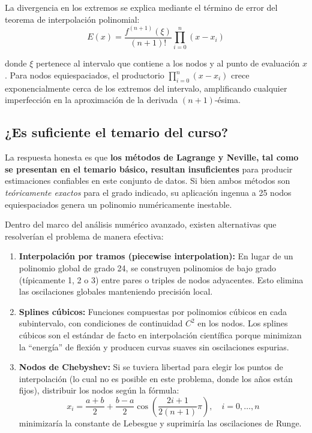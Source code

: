 \documentclass[12pt, letterpaper]{article}
\begin{document}
La divergencia en los extremos se explica mediante el término de error del teorema de interpolación polinomial:
\begin{equation}\label{eq:error}
E(x) = \frac{f^{(n+1)}(\xi)}{(n+1)!} \prod_{i=0}^{n} (x - x_i)
\end{equation}

donde $\xi$ pertenece al intervalo que contiene a los nodos y al punto de evaluación $x$. Para nodos equiespaciados, el productorio $\prod_{i=0}^{n} (x - x_i)$ crece exponencialmente cerca de los extremos del intervalo, amplificando cualquier imperfección en la aproximación de la derivada $(n+1)$-ésima.

\subsection{¿Es suficiente el temario del curso?}\label{subsec:temario}

La respuesta honesta es que \textbf{los métodos de Lagrange y Neville, tal como se presentan en el temario básico, resultan insuficientes} para producir estimaciones confiables en este conjunto de datos. Si bien ambos métodos son \textit{teóricamente exactos} para el grado indicado, su aplicación ingenua a 25 nodos equiespaciados genera un polinomio numéricamente inestable.

Dentro del marco del análisis numérico avanzado, existen alternativas que resolverían el problema de manera efectiva:

\begin{enumerate}
    \item \textbf{Interpolación por tramos (piecewise interpolation):} En lugar de un polinomio global de grado 24, se construyen polinomios de bajo grado (típicamente 1, 2 o 3) entre pares o triples de nodos adyacentes. Esto elimina las oscilaciones globales manteniendo precisión local.
    
    \item \textbf{Splines cúbicos:} Funciones compuestas por polinomios cúbicos en cada subintervalo, con condiciones de continuidad $C^2$ en los nodos. Los splines cúbicos son el estándar de facto en interpolación científica porque minimizan la ``energía'' de flexión y producen curvas suaves sin oscilaciones espurias.
    
    \item \textbf{Nodos de Chebyshev:} Si se tuviera libertad para elegir los puntos de interpolación (lo cual no es posible en este problema, donde los años están fijos), distribuir los nodos según la fórmula:
    \begin{equation}
    x_i = \frac{a+b}{2} + \frac{b-a}{2} \cos\left(\frac{2i+1}{2(n+1)}\pi\right), \quad i = 0, \ldots, n
    \end{equation}
    minimizaría la constante de Lebesgue y suprimiría las oscilaciones de Runge.
\end{enumerate}
\end{document}
